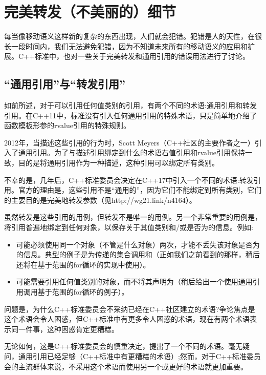 \section{完美转发（不美丽的）细节}
每当像移动语义这样新的复杂的东西出现，人们就会犯错。犯错是人的天性，在很长一段时间内，我们无法避免犯错，因为不知道未来所有的移动语义的应用和扩展。C++标准中，也对一些关于完美转发和通用引用的错误用法进行了讨论。

\subsection{“通用引用”与“转发引用”}

如前所述，对于可以引用任何值类别的引用，有两个不同的术语:通用引用和转发引用。在C++11中，标准没有引入任何通用引用的特殊术语，只是简单地介绍了函数模板形参的rvalue引用的特殊规则。

2012年，当描述这些引用的行为时，Scott Meyers（C++社区的主要作者之一）引入了通用引用。为了与描述引用绑定到什么的术语右值引用和rvalue引用保持一致，目的是将通用引用作为一种描述，这种引用可以绑定所有类别。

不幸的是，几年后，C++标准委员会决定在C++17中引入一个不同的术语:转发引用。官方的理由是，这些引用不是“通用的”，因为它们不能绑定到所有类别，它们的主要目的是完美地转发参数（见http://wg21.link/n4164）。

虽然转发是这些引用的用例，但转发不是唯一的用例。另一个非常重要的用例是，将引用普遍地绑定到任何对象，以保存关于其值类别和/或是否为的信息。例如:

\begin{itemize}
	\item 可能必须使用同一个对象（不管是什么对象）两次，才能不丢失该对象是否为的信息。典型的例子是为传递的集合调用和\cppinline{}（正如我们之前看到的那样，稍后还将在基于范围的for循环的实现中使用）。
	\item 可能需要引用任何值类别的对象，而不将其声明为（稍后给出一个使用通用引用调用基于范围的for循环的例子）。
\end{itemize}

问题是，为什么C++标准委员会不采纳已经在C++社区建立的术语?争论焦点是这个术语会令人困惑，但C++标准中有更多令人困惑的术语，现在有两个术语表示同一件事，这种困惑肯定更糟糕。

无论如何，这是C++标准委员会的慎重决定，提出了一个不同的术语。毫无疑问，通用引用已经足够（C++标准中有更糟糕的术语）;然而，对于C++标准委员会的主流群体来说，不采用这个术语而使用另一个或更好的术语就更加重要。

